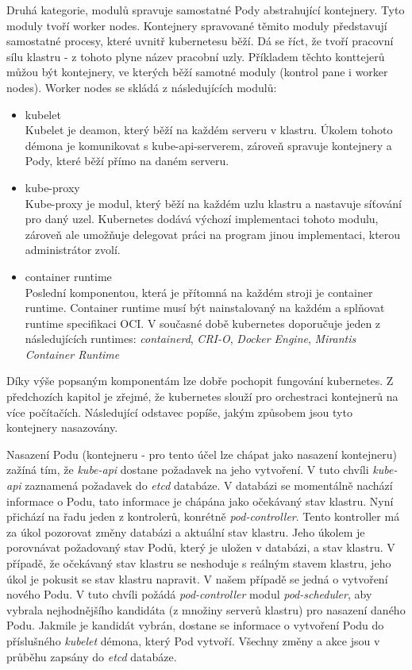 Druhá kategorie, modulů spravuje samostatné Pody abstrahující kontejnery. Tyto moduly tvoří worker nodes. Kontejnery spravované těmito moduly představují samostatné procesy, které uvnitř kubernetesu běží. Dá se říct, že tvoří pracovní sílu klastru - z tohoto plyne název pracobní uzly. Příkladem těchto konttejerů můžou být kontejnery, ve kterých běží samotné moduly (kontrol pane i worker nodes).
Worker nodes se skládá z následujících modulů:
\begin{itemize}
    \item kubelet\\
    Kubelet je deamon, který běží na každém serveru v klastru. Úkolem tohoto démona je komunikovat s kube-api-serverem, zároveň spravuje kontejnery a Pody, které běží přímo na daném serveru. 
    \item kube-proxy\\
    Kube-proxy je modul, který běží na každém uzlu klastru a nastavuje síťování pro daný uzel. Kubernetes dodává výchozí implementaci tohoto modulu, zároveň ale umožňuje delegovat práci na program jinou implementaci, kterou administrátor zvolí. 
    \item container runtime\\
    Poslední komponentou, která je přítomná na každém stroji je container runtime. Container runtime musí být nainstalovaný na každém a splňovat runtime specifikaci OCI. V současné době kubernetes doporučuje jeden z následujících runtimes: \textit{containerd}, \textit{CRI-O}, \textit{Docker Engine}, \textit{Mirantis Container Runtime} \cite{a2023_container} 
\end{itemize}

Díky výše popsaným komponentám lze dobře pochopit fungování kubernetes. Z předchozích kapitol je zřejmé, že kubernetes slouží pro orchestraci kontejnerů na více počítačích. Následující odstavec popíše, jakým způsobem jsou tyto kontejnery nasazovány.

Nasazení Podu (kontejneru - pro tento účel lze  chápat jako nasazení kontejneru) zažíná tím, že \textit{kube-api} dostane požadavek na jeho vytvoření. V tuto chvíli \textit{kube-api} zaznamená požadavek do \textit{etcd} databáze. V databázi se momentálně nachází informace o Podu, tato informace je chápána jako očekávaný stav klastru. Nyní přichází na řadu jeden z kontrolerů, konrétně \textit{pod-controller}. Tento kontroller má za úkol pozorovat změny databázi a aktuální stav klastru. Jeho úkolem je porovnávat požadovaný stav Podů, který je uložen v databázi, a stav klastru. V případě, že očekávaný stav klastru se neshoduje s reálným stavem klastru, jeho úkol je pokusit se stav klastru napravit. V našem případě se jedná o vytvoření nového Podu. V tuto chvíli požádá \textit{pod-controller} modul \textit{pod-scheduler}, aby vybrala nejhodnějšího kandidáta (z množiny serverů klastru) pro nasazení daného Podu. Jakmile je kandidát vybrán, dostane se informace o vytvoření Podu do příslušného \textit{kubelet} démona, který Pod vytvoří. Všechny změny a akce jsou v průběhu zapsány do \textit{etcd} databáze.  

